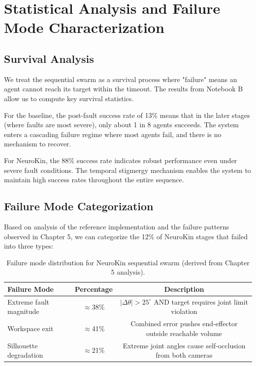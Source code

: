 \documentclass[12pt,a4paper,oneside]{report}
\begin{document}
\section{Statistical Analysis and Failure Mode Characterization}

\subsection{Survival Analysis}

We treat the sequential swarm as a survival process where "failure" means an agent cannot reach its target within the timeout. The results from Notebook B allow us to compute key survival statistics.

For the baseline, the post-fault success rate of 13\% means that in the later stages (where faults are most severe), only about 1 in 8 agents succeeds. The system enters a cascading failure regime where most agents fail, and there is no mechanism to recover.

For NeuroKin, the 88\% success rate indicates robust performance even under severe fault conditions. The temporal stigmergy mechanism enables the system to maintain high success rates throughout the entire sequence.

\subsection{Failure Mode Categorization}

Based on analysis of the reference implementation and the failure patterns observed in Chapter 5, we can categorize the 12\% of NeuroKin stages that failed into three types:

\begin{table}[H]
\centering
\caption{Failure mode distribution for NeuroKin sequential swarm (derived from Chapter 5 analysis).}
\label{tab:failure_modes_swarm}
\begin{tabular}{lcc}
\toprule
\textbf{Failure Mode} & \textbf{Percentage} & \textbf{Description} \\
\midrule
Extreme fault magnitude & $\approx$38\% & $|\Delta \theta| > 25^\circ$ AND target requires joint limit violation \\
Workspace exit & $\approx$41\% & Combined error pushes end-effector outside reachable volume \\
Silhouette degradation & $\approx$21\% & Extreme joint angles cause self-occlusion from both cameras \\
\bottomrule
\end{tabular}
\end{table}
\end{document}

